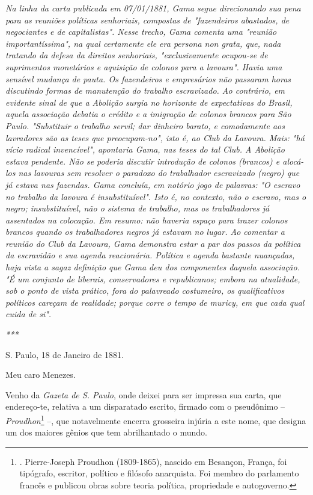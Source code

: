 \emph{Na linha da carta publicada em 07/01/1881, Gama segue direcionando
sua pena para as reuniões políticas senhoriais, compostas de
"fazendeiros abastados, de negociantes e de capitalistas". Nesse trecho,
Gama comenta uma "reunião importantíssima", na qual certamente ele era
persona non grata, que, nada tratando da defesa da direitos senhoriais,
"exclusivamente ocupou-se de suprimentos monetários e aquisição de
colonos para a lavoura". Havia uma sensível mudança de pauta. Os
fazendeiros e empresários não passaram horas discutindo formas de
manutenção do trabalho escravizado. Ao contrário, em evidente sinal de
que a Abolição surgia no horizonte de expectativas do Brasil, aquela
associação debatia o crédito e a imigração de colonos brancos para São
Paulo. "Substituir o trabalho servil; dar dinheiro barato, e comodamente
aos lavradores são as teses que preocupam-no", isto é, ao Club da
Lavoura. Mais: "há vício radical invencível", apontaria Gama, nas teses
do tal Club. A Abolição estava pendente. Não se poderia discutir
introdução de colonos (brancos) e alocá-los nas lavouras sem resolver o
paradoxo do trabalhador escravizado (negro) que já estava nas fazendas.
Gama concluía, em notório jogo de palavras: "O escravo no trabalho da
lavoura é insubstituível". Isto é, no contexto, não o escravo, mas o
negro; insubstituível, não o sistema de trabalho, mas os trabalhadores
já assentados na colocação. Em resumo: não haveria espaço para trazer
colonos brancos quando os trabalhadores negros já estavam no lugar. Ao
comentar a reunião do Club da Lavoura, Gama demonstra estar a par dos
passos da política da escravidão e sua agenda reacionária. Política e
agenda bastante nuançadas, haja vista a sagaz definição que Gama deu dos
componentes daquela associação. "É um conjunto de liberais,
conservadores e republicanos; embora na atualidade, sob o ponto de vista
prático, fora do palavreado costumeiro, os qualificativos políticos
careçam de realidade; porque corre o tempo de muricy, em que cada qual
cuida de si".}

\emph{***}

S. Paulo, 18 de Janeiro de 1881.

Meu caro Menezes.

Venho da \emph{Gazeta de S. Paulo}, onde deixei para ser impressa sua
carta, que endereço-te, relativa a um disparatado escrito, firmado com o
pseudônimo -- \emph{Proudhon}\footnote{. Pierre-Joseph Proudhon
  (1809-1865), nascido em Besançon, França, foi tipógrafo, escritor,
  político e filósofo anarquista. Foi membro do parlamento francês e
  publicou obras sobre teoria política, propriedade e autogoverno.} --,
que notavelmente encerra grosseira injúria a este nome, que designa um
dos maiores gênios que tem abrilhantado o mundo.

